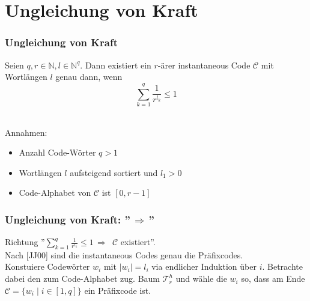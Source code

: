 \documentclass{beamer}
\begin{document}
\section{Ungleichung von Kraft}
\begin{frame}
    \frametitle{Ungleichung von Kraft}
    Seien $q,r \in \mathbb{N}, l \in \mathbb{N}^q$. Dann existiert ein $r$-ärer instantaneous Code $\mathcal{C}$
    mit Wortlängen $l$ genau dann, wenn
    $$
        \sum_{k=1}^{q} \frac{1}{r^{l_k}} \leq 1
    $$\\[20pt]
    \pause

    Annahmen:

    \begin{itemize}
        \item Anzahl Code-Wörter $q > 1$
        \pause
        \item Wortlängen $l$ aufsteigend sortiert und $l_1 > 0$
        \pause
        \item Code-Alphabet von $\mathcal{C}$ ist $[0,r-1]$
    \end{itemize}
\end{frame}

\begin{frame}
    \frametitle{Ungleichung von Kraft: ''$\,\Longrightarrow\,$''}
    Richtung ''$\sum_{k=1}^{q} \frac{1}{r^{l_k}} \leq 1 \,\Longrightarrow\,$ $\mathcal{C}$ existiert''.\\[10pt]
    \pause
    Nach [JJ00] sind die instantaneous Codes genau die Präfixcodes.\\[10pt]
    \pause
    Konstuiere Codewörter $w_i$ mit $|w_i| = l_i$ via endlicher Induktion über $i$.
    Betrachte dabei den zum Code-Alphabet zug. Baum $\mathcal{T}_r^h$ und wähle die $w_i$ so, dass
    am Ende $\mathcal{C} = \{w_i \mid i \in [1,q]\}$ ein Präfixcode ist.
\end{frame}
\end{document}
